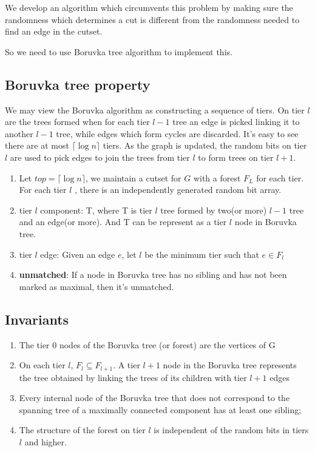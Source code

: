 \documentclass[conference,compsoc]{IEEEtran}
\begin{document}
We develop an algorithm which circumvents this problem by making sure the randomness which determines a cut is different from the randomness needed to find an edge in the cutset.

So we need to use Boruvka tree algorithm to implement this.
\subsection{Boruvka tree property}
	We may view the Boruvka algorithm as constructing a sequence of tiers. On tier $l$ are the trees formed when for each tier $l-1$ tree an edge is picked linking it to another $l-1$ tree, while edges which form cycles are discarded. It's easy to see there are at most $\lceil \log n\rceil$ tiers. As the graph is updated, the random bits on tier $l$ are used to pick edges to join the trees from tier $l$ to form trees on tier $l + 1$.
\begin{enumerate}
\item Let $top = \lceil \log n\rceil$, we maintain a cutset for $G$ with a forest $F_L$ for each tier. For each tier $l$ , there is an independently generated random bit array.
\item tier $l$ component: T, where T is tier $l$ tree formed by two(or more) $l-1$ tree and an edge(or more). And T can be represent as a tier $l$ node in Boruvka tree.
\item tier $l$ edge: Given an edge $e$, let $l$ be the minimum tier such that $e \in F_l$
\item \textbf{unmatched}: If a node in Boruvka tree has no sibling and has not been marked as maximal, then it's unmatched.
\end{enumerate}

\subsection{Invariants}
\begin{enumerate}
	\item The tier 0 nodes of the Boruvka tree (or forest) are the vertices of G
	\item On each tier $l$, $F_l \subseteq F_{l+1}$. A tier $l + 1$ node in the Boruvka tree represents the tree obtained by linking the trees of its children with tier $l + 1$ edges
	\item Every internal node of the Boruvka tree that does not correspond to the spanning tree of a maximally connected component has at least one sibling;
	\item The structure of the forest on tier $l$ is independent of the random bits in tiers $l$ and higher.
\end{enumerate}
\end{document}
